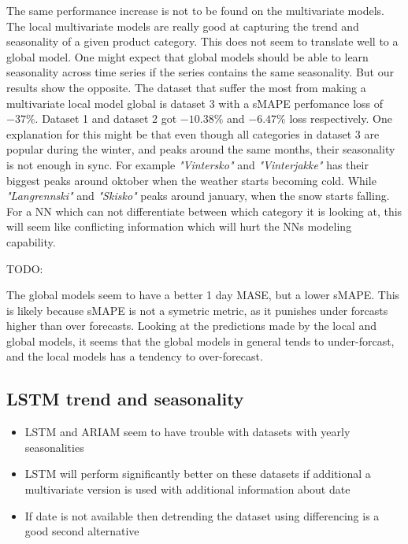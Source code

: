 The same performance increase is not to be found on the multivariate models.
The local multivariate models are really good at capturing the trend and seasonality of
a given product category. This does not seem to translate well to a global model.
One might expect that global models should be able to learn seasonality across
time series if the series contains the same seasonality. But our results show the opposite.
The dataset that suffer the most from making a multivariate local model global is dataset 3
with a sMAPE perfomance loss of $-37\%$. Dataset 1 and dataset 2 got $-10.38\%$ and $-6.47\%$ loss
respectively.
One explanation for this might be that even though all categories in dataset 3 are popular during the
winter, and peaks around the same months, their seasonality is not enough in sync.
For example \textit{"Vintersko"} and \textit{"Vinterjakke"} has their biggest peaks around oktober
when the weather starts becoming cold. While \textit{"Langrennski"} and \textit{"Skisko"}
peaks around january, when the snow starts falling. For a NN which can not differentiate between
which category it is looking at, this will seem like conflicting information which will
hurt the NNs modeling capability.



TODO:
%

The global models seem to have a better 1 day MASE, but a lower sMAPE.
This is likely because sMAPE is not a symetric metric, as it punishes
under forcasts higher than over forecasts. Looking at the predictions made by
the local and global models, it seems that the global models in general tends to
under-forcast, and the local models has a tendency to over-forecast.

\subsection{LSTM trend and seasonality}
\begin{itemize}
  \item LSTM and ARIAM seem to have trouble with datasets with yearly seasonalities
  \item {LSTM will perform significantly better on these datasets if additional
        a multivariate version is used with additional information about date}
  \item {If date is not available then detrending the dataset using differencing is a good second alternative}
\end{itemize}


